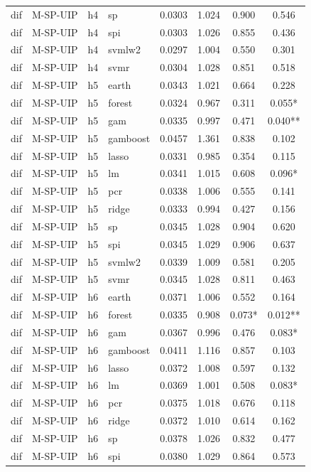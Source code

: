 \begin{ThreePartTable}
\begin{longtable}[t]{llclcccc}
dif & M-SP-UIP & h4 & sp & 0.0303 & 1.024 & 0.900 & 0.546\\
dif & M-SP-UIP & h4 & spi & 0.0303 & 1.026 & 0.855 & 0.436\\
dif & M-SP-UIP & h4 & svmlw2 & 0.0297 & 1.004 & 0.550 & 0.301\\
dif & M-SP-UIP & h4 & svmr & 0.0304 & 1.028 & 0.851 & 0.518\\
\addlinespace
dif & M-SP-UIP & h5 & earth & 0.0343 & 1.021 & 0.664 & 0.228\\
dif & M-SP-UIP & h5 & forest & 0.0324 & 0.967 & 0.311 & 0.055*\\
dif & M-SP-UIP & h5 & gam & 0.0335 & 0.997 & 0.471 & 0.040**\\
dif & M-SP-UIP & h5 & gamboost & 0.0457 & 1.361 & 0.838 & 0.102\\
dif & M-SP-UIP & h5 & lasso & 0.0331 & 0.985 & 0.354 & 0.115\\
dif & M-SP-UIP & h5 & lm & 0.0341 & 1.015 & 0.608 & 0.096*\\
dif & M-SP-UIP & h5 & pcr & 0.0338 & 1.006 & 0.555 & 0.141\\
dif & M-SP-UIP & h5 & ridge & 0.0333 & 0.994 & 0.427 & 0.156\\
dif & M-SP-UIP & h5 & sp & 0.0345 & 1.028 & 0.904 & 0.620\\
dif & M-SP-UIP & h5 & spi & 0.0345 & 1.029 & 0.906 & 0.637\\
dif & M-SP-UIP & h5 & svmlw2 & 0.0339 & 1.009 & 0.581 & 0.205\\
dif & M-SP-UIP & h5 & svmr & 0.0345 & 1.028 & 0.811 & 0.463\\
\addlinespace
dif & M-SP-UIP & h6 & earth & 0.0371 & 1.006 & 0.552 & 0.164\\
dif & M-SP-UIP & h6 & forest & 0.0335 & 0.908 & 0.073* & 0.012**\\
dif & M-SP-UIP & h6 & gam & 0.0367 & 0.996 & 0.476 & 0.083*\\
dif & M-SP-UIP & h6 & gamboost & 0.0411 & 1.116 & 0.857 & 0.103\\
dif & M-SP-UIP & h6 & lasso & 0.0372 & 1.008 & 0.597 & 0.132\\
dif & M-SP-UIP & h6 & lm & 0.0369 & 1.001 & 0.508 & 0.083*\\
dif & M-SP-UIP & h6 & pcr & 0.0375 & 1.018 & 0.676 & 0.118\\
dif & M-SP-UIP & h6 & ridge & 0.0372 & 1.010 & 0.614 & 0.162\\
dif & M-SP-UIP & h6 & sp & 0.0378 & 1.026 & 0.832 & 0.477\\
dif & M-SP-UIP & h6 & spi & 0.0380 & 1.029 & 0.864 & 0.573\\

\end{longtable}
\end{ThreePartTable}
